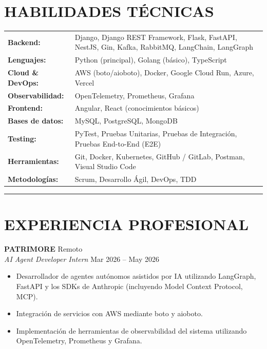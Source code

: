 \documentclass[11pt, a4paper]{article}
\begin{document}
\section*{HABILIDADES TÉCNICAS}
\vspace{-2pt}
\begin{tabular}{p{} p{}}
\textbf{Backend:} & Django, Django REST Framework, Flask, FastAPI, NestJS, Gin, Kafka, RabbitMQ, LangChain, LangGraph \\
\textbf{Lenguajes:} & Python (principal), Golang (básico), TypeScript \\
\textbf{Cloud \& DevOps:} & AWS (boto/aioboto), Docker, Google Cloud Run, Azure, Vercel \\
\textbf{Observabilidad:} & OpenTelemetry, Prometheus, Grafana \\
\textbf{Frontend:} & Angular, React (conocimientos básicos) \\
\textbf{Bases de datos:} & MySQL, PostgreSQL, MongoDB \\
\textbf{Testing:} & PyTest, Pruebas Unitarias, Pruebas de Integración, Pruebas End-to-End (E2E) \\
\textbf{Herramientas:} & Git, Docker, Kubernetes, GitHub / GitLab, Postman, Visual Studio Code \\
\textbf{Metodologías:} & Scrum, Desarrollo Ágil, DevOps, TDD \\
\end{tabular}
\vspace{6pt}
\hrule
\vspace{8pt}

\section*{EXPERIENCIA PROFESIONAL}

\textbf{PATRIMORE} \hfill Remoto \\
\textit{AI Agent Developer Intern} \hfill Mar 2026 -- May 2026

\begin{itemize}
\item Desarrollador de agentes autónomos asistidos por IA utilizando LangGraph, FastAPI y los SDKs de Anthropic (incluyendo Model Context Protocol, MCP).
\item Integración de servicios con AWS mediante boto y aioboto.
\item Implementación de herramientas de observabilidad del sistema utilizando OpenTelemetry, Prometheus y Grafana.
\end{itemize}
\end{document}
